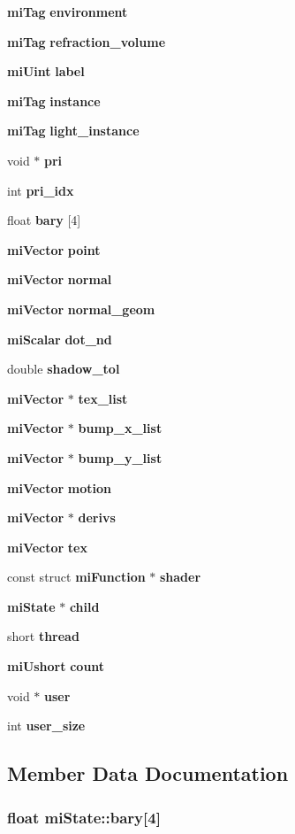 \begin{CompactItemize}
\item 
{\bf mi\-Tag} {\bf environment}
\item 
{\bf mi\-Tag} {\bf refraction\_\-volume}
\item 
{\bf mi\-Uint} {\bf label}
\item 
{\bf mi\-Tag} {\bf instance}
\item 
{\bf mi\-Tag} {\bf light\_\-instance}
\item 
void $\ast$ {\bf pri}
\item 
int {\bf pri\_\-idx}
\item 
float {\bf bary} [4]
\item 
{\bf mi\-Vector} {\bf point}
\item 
{\bf mi\-Vector} {\bf normal}
\item 
{\bf mi\-Vector} {\bf normal\_\-geom}
\item 
{\bf mi\-Scalar} {\bf dot\_\-nd}
\item 
double {\bf shadow\_\-tol}
\item 
{\bf mi\-Vector} $\ast$ {\bf tex\_\-list}
\item 
{\bf mi\-Vector} $\ast$ {\bf bump\_\-x\_\-list}
\item 
{\bf mi\-Vector} $\ast$ {\bf bump\_\-y\_\-list}
\item 
{\bf mi\-Vector} {\bf motion}
\item 
{\bf mi\-Vector} $\ast$ {\bf derivs}
\item 
{\bf mi\-Vector} {\bf tex}
\item 
const struct {\bf mi\-Function} $\ast$ {\bf shader}
\item 
{\bf mi\-State} $\ast$ {\bf child}
\item 
short {\bf thread}
\item 
{\bf mi\-Ushort} {\bf count}
\item 
void $\ast$ {\bf user}
\item 
int {\bf user\_\-size}
\end{CompactItemize}


\subsection{Member Data Documentation}
\subsubsection{\setlength{\rightskip}{0pt plus 5cm}float {\bf mi\-State::bary}[4]}\label{structmiState_o34}


